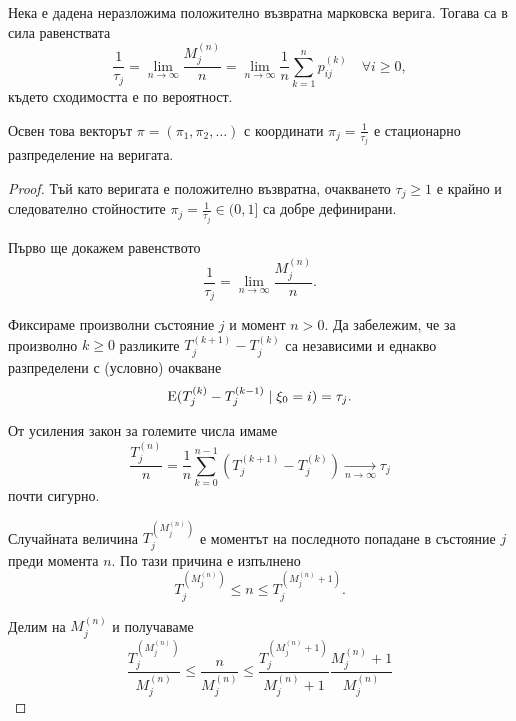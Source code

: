 \documentclass{../../common/topic}
\begin{document}
\begin{theorem}
  Нека е дадена неразложима положително възвратна марковска верига. Тогава са в сила равенствата
  \begin{equation*}
    \frac 1 {\tau_j}
    =
    \lim_{n \to \infty} \frac {M^{(n)}_j} n
    =
    \lim_{n \to \infty} \frac 1 n \sum_{k=1}^n p_{ij}^{(k)}\quad\forall i \geq 0,
  \end{equation*}
  където сходимостта е по вероятност.

  Освен това векторът \( \pi = (\pi_1, \pi_2, \ldots) \) с координати \( \pi_j = \frac 1 {\tau_j} \) е стационарно разпределение на веригата.
\end{theorem}
\begin{proof}
  Тъй като веригата е положително възвратна, очакването \( \tau_j \geq 1 \) е крайно и следователно стойностите \( \pi_j = \frac 1 {\tau_j} \in (0, 1] \) са добре дефинирани.

  Първо ще докажем равенството
  \begin{equation*}
    \frac 1 {\tau_j}
    =
    \lim_{n \to \infty} \frac {M^{(n)}_j} n.
  \end{equation*}

  Фиксираме произволни състояние \( j \) и момент \( n > 0 \). Да забележим, че за произволно \( k \geq 0 \) разликите \( T_j^{(k+1)} - T_j^{(k)} \) са независими и еднакво разпределени с (условно) очакване
  \begin{equation*}
   \operatorname{E}(T_j^{(k)} - T_j^{(k-1)} \mid \xi_0 = i) = \tau_j.
  \end{equation*}

  От усиления закон за големите числа имаме
  \begin{equation*}
    \frac {T_j^{(n)}} n = \frac 1 n \sum_{k=0}^{n-1} (T_j^{(k+1)} - T_j^{(k)}) \xrightarrow[n \to \infty]{} \tau_j
  \end{equation*}
  почти сигурно.

  Случайната величина \( T_j^{(M_j^{(n)})} \) е моментът на последното попадане в състояние \( j \) преди момента \( n \). По тази причина е изпълнено
  \begin{equation*}
    T_j^{(M_j^{(n)})} \leq n \leq T_j^{(M_j^{(n)} + 1)}.
  \end{equation*}

  Делим на \( M_j^{(n)} \) и получаваме
  \begin{equation*}
    \frac {T_j^{(M_j^{(n)})}} {M_j^{(n)}} \leq \frac n {M_j^{(n)}} \leq \frac {T_j^{(M_j^{(n)} + 1)}} {M_j^{(n)} + 1} \frac {M_j^{(n)} + 1} {M_j^{(n)}}
  \end{equation*}


\end{proof}
\end{document}
